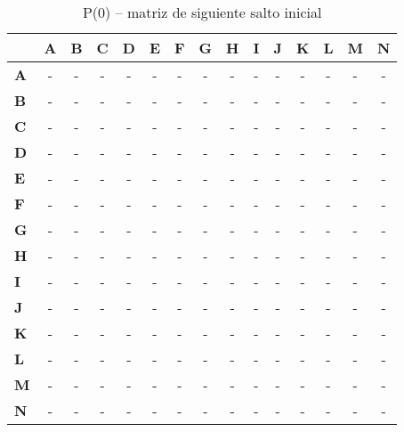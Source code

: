 \documentclass{article}
\begin{document}
\begin{table}[H]\centering
\caption{P(0) -- matriz de siguiente salto inicial}
\begin{tabular}{l c c c c c c c c c c c c c c}
\toprule
 & \textbf{A} & \textbf{B} & \textbf{C} & \textbf{D} & \textbf{E} & \textbf{F} & \textbf{G} & \textbf{H} & \textbf{I} & \textbf{J} & \textbf{K} & \textbf{L} & \textbf{M} & \textbf{N}\\\midrule
\textbf{A} & - & - & - & - & - & - & - & - & - & - & - & - & - & - \\
\textbf{B} & - & - & - & - & - & - & - & - & - & - & - & - & - & - \\
\textbf{C} & - & - & - & - & - & - & - & - & - & - & - & - & - & - \\
\textbf{D} & - & - & - & - & - & - & - & - & - & - & - & - & - & - \\
\textbf{E} & - & - & - & - & - & - & - & - & - & - & - & - & - & - \\
\textbf{F} & - & - & - & - & - & - & - & - & - & - & - & - & - & - \\
\textbf{G} & - & - & - & - & - & - & - & - & - & - & - & - & - & - \\
\textbf{H} & - & - & - & - & - & - & - & - & - & - & - & - & - & - \\
\textbf{I} & - & - & - & - & - & - & - & - & - & - & - & - & - & - \\
\textbf{J} & - & - & - & - & - & - & - & - & - & - & - & - & - & - \\
\textbf{K} & - & - & - & - & - & - & - & - & - & - & - & - & - & - \\
\textbf{L} & - & - & - & - & - & - & - & - & - & - & - & - & - & - \\
\textbf{M} & - & - & - & - & - & - & - & - & - & - & - & - & - & - \\
\textbf{N} & - & - & - & - & - & - & - & - & - & - & - & - & - & - \\
\bottomrule
\end{tabular}
\end{table}
\end{document}

